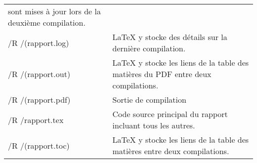 \begin{onecolumn}
\begin{longtable}{>{\ttfamily}m{} p{}}
                                 sont mises à jour lors de la deuxième
                                 compilation.\\
    /R /(rapport.log)          & LaTeX y stocke des détails sur la
                                 dernière compilation.\\
    /R /(rapport.out)          & LaTeX y stocke les liens de la table
                                 des matières du PDF entre deux
                                 compilations.\\
    /R /(rapport.pdf)          & Sortie de compilation\\
    /R /rapport.tex            & Code source principal du rapport
                                 incluant tous les autres.\\
    /R /(rapport.toc)          & LaTeX y stocke les liens de la table
                                 des matières entre deux
                                 compilations.\\
\end{longtable}

\end{onecolumn}

